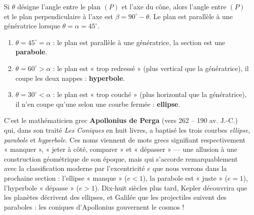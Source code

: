 \documentclass[11pt]{article}
\begin{document}
\begin{corrige}
Si $\theta$ désigne l'angle entre le plan $(P)$ et l'axe du cône, alors l'angle entre $(P)$ et le plan perpendiculaire à l'axe est $\beta = 90^{\circ} - \theta$. Le plan est parallèle à une génératrice lorsque $\theta = \alpha = 45^{\circ}$.
\begin{enumerate}
\item $\theta = 45^{\circ} = \alpha$ : le plan est parallèle à une génératrice, la section est une \textbf{parabole}.
\item $\theta = 60^{\circ} > \alpha$ : le plan est « trop redressé » (plus vertical que la génératrice), il coupe les deux nappes : \textbf{hyperbole}.
\item $\theta = 30^{\circ} < \alpha$ : le plan est « trop couché » (plus horizontal que la génératrice), il n'en coupe qu'une selon une courbe fermée : \textbf{ellipse}.
\end{enumerate}
\end{corrige}

\begin{savaistu}
C'est le mathématicien grec \textbf{Apollonius de Perga} (vers 262 -- 190 av. J.-C.) qui, dans son traité \emph{Les Coniques} en huit livres, a baptisé les trois courbes \emph{ellipse}, \emph{parabole} et \emph{hyperbole}. Ces noms viennent de mots grecs signifiant respectivement « manquer », « jeter à côté, comparer » et « dépasser » — une allusion à une construction géométrique de son époque, mais qui s'accorde remarquablement avec la classification moderne par l'excentricité $e$ que nous verrons dans la prochaine section : l'ellipse « manque » ($e < 1$), la parabole est « juste » ($e = 1$), l'hyperbole « dépasse » ($e > 1$). Dix-huit siècles plus tard, Kepler découvrira que les planètes décrivent des ellipses, et Galilée que les projectiles suivent des paraboles : les coniques d'Apollonius gouvernent le cosmos !
\end{savaistu}
\end{document}
